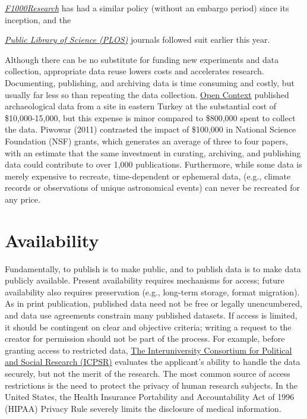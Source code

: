 \documentclass[10pt,a4paper,twocolumn]{article}
\begin{document}
\href{http://f1000research.com}{\emph{F1000Research}} has had a similar policy (without an embargo period) since its inception, and the {\href{http://www.plos.org/}{\emph{Public Library of Science (PLOS)}} journals followed suit earlier this year\cite{bloom_data_2014}.

Although there can be no substitute for funding new experiments and data collection, appropriate data reuse lowers costs and accelerates research.
Documenting, publishing, and archiving data is time consuming and costly, but usually far less so than repeating the data collection.
\href{http://opencontext.org/}{Open Context} published archaeological data from a site in eastern Turkey at the substantial cost of \$10,000-15,000, but this expense is minor compared to \$800,000 spent to collect the data\cite{kansa_we_2013}.
Piwowar (2011) contrasted the impact of \$100,000 in National Science Foundation (NSF) grants, which generates an average of three to four papers, with an estimate that the same investment in curating, archiving, and publishing data could contribute to over 1,000 publications\cite{piwowar_data_2011}.
Furthermore, while some data is merely expensive to recreate, time-dependent or ephemeral data, (e.g., climate records or observations of unique astronomical events) can never be recreated for any price\cite{gray_online_2002}.

\section*{Availability}\label{availability}

Fundamentally, to publish is to make public, and to publish data is to make data publicly available.
Present availability requires mechanisms for access; future availability also requires preservation (e.g., long-term storage, format migration)\cite{waters_preserving_1996, beagrie_digital_2008, gray_online_2002}.
As in print publication, published data need not be free or legally unencumbered, and data use agreements constrain many published datasets.
If access is limited, it should be contingent on clear and objective criteria; writing a request to the creator for permission should not be part of the process.
For example, before granting access to restricted data, \href{http://www.icpsr.umich.edu/icpsrweb/content/deposit/confidentiality.html}{The Interuniversity Consortium for Political and Social Research (ICPSR)} evaluates the applicant's ability to handle the data securely, but not the merit of the research.
The most common source of access restrictions is the need to protect the privacy of human research subjects.
In the United States, the Health Insurance Portability and Accountability Act of 1996 (HIPAA) Privacy Rule severely limits the disclosure of medical information\cite{office_for_civil_rights_renal_2003}.

}
\end{document}

